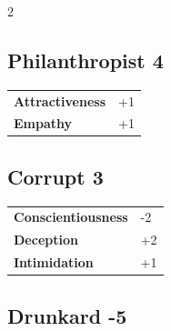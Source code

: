 \begin{multicols}{2}
\begin{tcolorbox}

\end{tcolorbox}

\begin{tcolorbox}
    \subsection*{Philanthropist \hfill \small{4 }}
    \tcblower




\begin{tabular}{@{}ll@{}}
    \textbf{Attractiveness} & +1\\
    \textbf{Empathy} & +1\\
\end{tabular}


\end{tcolorbox}

\begin{tcolorbox}
    \subsection*{Corrupt \hfill \small{3 }}
    \tcblower




\begin{tabular}{@{}ll@{}}
    \textbf{Conscientiousness} & -2\\
    \textbf{Deception} & +2\\
    \textbf{Intimidation} & +1\\
\end{tabular}


\end{tcolorbox}

\begin{tcolorbox}
    \subsection*{Drunkard \hfill \small{-5 }}
    \tcblower





\end{tcolorbox}
\end{multicols}
